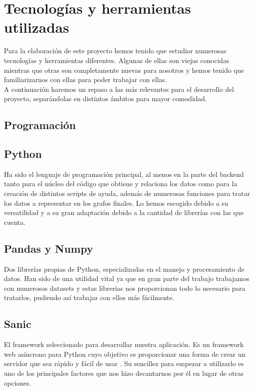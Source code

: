 \section{Tecnologías y herramientas utilizadas}
\label{sec:tecnologias}

Para la elaboración de este proyecto hemos tenido que estudiar numerosas tecnologías y herramientas diferentes. Algunas de ellas son viejas conocidas mientras que otras son completamente nuevas para nosotros y hemos tenido que familiarizarnos con ellas para poder trabajar con ellas.\\

A continuación haremos un repaso a las más relevantes para el desarrollo del proyecto, separándolas en distintos ámbitos para mayor comodidad.\\

\subsection{Programación}

\subsection*{Python}

Ha sido el lenguaje de programación principal, al menos en la parte del backend tanto para el núcleo del código que obtiene y relaciona los datos como para la creación de distintos scripts de ayuda, además de numerosas funciones para tratar los datos a representar en los grafos finales. Lo hemos escogido debido a su versatilidad y a su gran adaptación debido a la cantidad de librerías con las que cuenta.

\subsection*{Pandas y Numpy}

Dos librerías propias de Python, especializadas en el manejo y procesamiento de datos. Han sido de una utilidad vital ya que en gran parte del trabajo trabajamos con numerosos datasets y estas librerías nos proporcionan todo lo necesario para tratarlos, pudiendo así trabajar con ellos más fácilmente.

\subsection*{Sanic}

El framework seleccionado para desarrollar nuestra aplicación. Es un framework web asíncrono para Python cuyo objetivo es proporcionar una forma de crear un servidor que sea rápido y fácil de usar \cite{sanic}. Su sencillez para empezar a utilizarlo es uno de los principales factores que nos hizo decantarnos por él en lugar de otras opciones.

